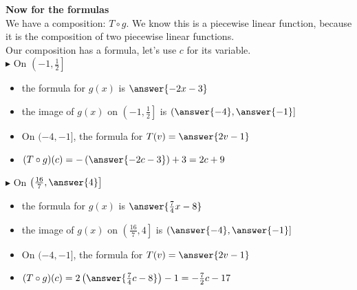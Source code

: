 \documentclass{ximera}
\begin{document}
\begin{explanation}


\textbf{Now for the formulas} \\


We have a composition: $T \circ g$.  We know this is a piecewise linear function, because it is the composition of two piecewise linear functions. \\

Our composition has a formula, let's use $c$ for its variable. \\





$\blacktriangleright$ On $\left( -1, \frac{1}{2} \right]$




\begin{itemize}

\item the formula for $g(x)$ is $\answer{-2x-3}$
\item the image of $g(x)$ on $\left( -1, \frac{1}{2} \right]$ is $\left( \answer{-4}, \answer{-1} \right]$
\item On $( -4, -1 ]$, the formula for $T(v) = \answer{2v-1}$  \\
\item $(T \circ g)(c) = -\left(\answer{-2c-3}\right) + 3 = 2c +9$ \\


\end{itemize}








$\blacktriangleright$ On $\left( \frac{16}{7}, \answer{4} \right]$



\begin{itemize}

\item the formula for $g(x)$ is $\answer{\frac{7}{4}x - 8}$
\item the image of $g(x)$ on $\left( \frac{16}{7}, 4 \right]$ is $\left( \answer{-4}, \answer{-1} \right]$
\item On $( -4, -1 ]$, the formula for $T(v) = \answer{2v-1}$  \\
\item $(T \circ g)(c) = 2\left(\answer{\frac{7}{4}c - 8}\right) - 1 = -\frac{7}{2}c - 17$ \\


\end{itemize}













\end{explanation}
\end{document}
